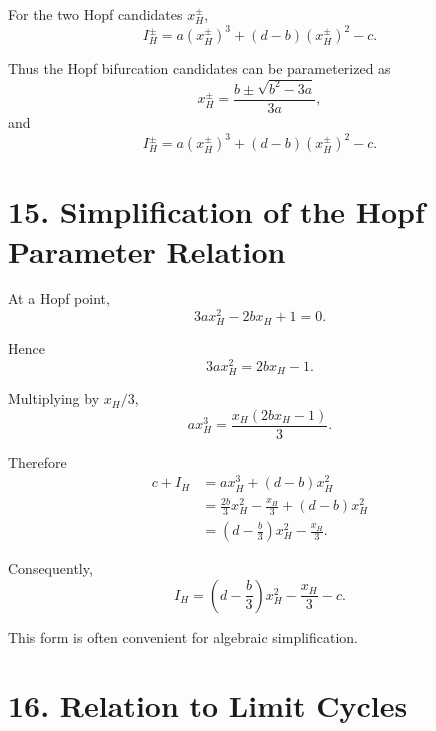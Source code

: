 \documentclass[11pt,a4paper]{article}
\begin{document}
For the two Hopf candidates $x_H^\pm$,
\begin{equation}
\boxed{
I_H^\pm
=
a(x_H^\pm)^3
+
(d-b)(x_H^\pm)^2
-c.
}
\tag{52}
\end{equation}

Thus the Hopf bifurcation candidates can be parameterized as
\begin{equation}
\boxed{
x_H^\pm
=
\frac{
b\pm\sqrt{b^2-3a}
}{
3a
},
}
\tag{53}
\end{equation}
and
\begin{equation}
\boxed{
I_H^\pm
=
a(x_H^\pm)^3
+
(d-b)(x_H^\pm)^2
-c.
}
\tag{54}
\end{equation}

\section{15. Simplification of the Hopf Parameter Relation}

At a Hopf point,
\begin{equation}
3ax_H^2-2bx_H+1=0.
\end{equation}

Hence
\begin{equation}
3ax_H^2=2bx_H-1.
\tag{55}
\end{equation}

Multiplying by $x_H/3$,
\begin{equation}
a x_H^3
=
\frac{x_H(2bx_H-1)}{3}.
\tag{56}
\end{equation}

Therefore
\begin{align}
c+I_H
&=
a x_H^3+(d-b)x_H^2\\
&=
\frac{2b}{3}x_H^2-\frac{x_H}{3}
+(d-b)x_H^2\\
&=
\left(d-\frac b3\right)x_H^2
-\frac{x_H}{3}.
\end{align}

Consequently,
\begin{equation}
\boxed{
I_H
=
\left(d-\frac b3\right)x_H^2
-\frac{x_H}{3}
-c.
}
\tag{57}
\end{equation}

This form is often convenient for algebraic simplification.

\section{16. Relation to Limit Cycles}
\end{document}

